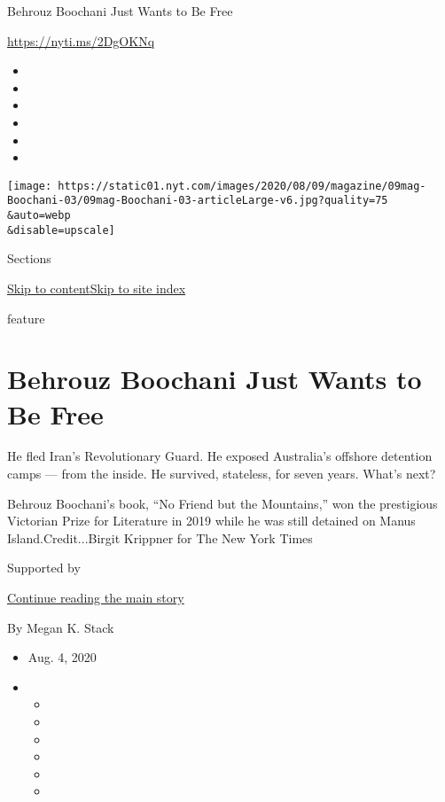 Behrouz Boochani Just Wants to Be Free

\url{https://nyti.ms/2DgOKNq}

\begin{itemize}
\item
\item
\item
\item
\item
\item
\end{itemize}

\texttt{[image: https://static01.nyt.com/images/2020/08/09/magazine/09mag-Boochani-03/09mag-Boochani-03-articleLarge-v6.jpg?quality=75\\\&auto=webp\\\&disable=upscale]}

Sections

\protect\hyperlink{site-content}{Skip to
content}\protect\hyperlink{site-index}{Skip to site index}

feature

\hypertarget{behrouz-boochani-just-wants-to-be-free}{%
\section{Behrouz Boochani Just Wants to Be
Free}\label{behrouz-boochani-just-wants-to-be-free}}

He fled Iran's Revolutionary Guard. He exposed Australia's offshore
detention camps --- from the inside. He survived, stateless, for seven
years. What's next?

Behrouz Boochani's book, ``No Friend but the Mountains,'' won the
prestigious Victorian Prize for Literature in 2019 while he was still
detained on Manus Island.Credit...Birgit Krippner for The New York Times

Supported by

\protect\hyperlink{after-sponsor}{Continue reading the main story}

By Megan K. Stack

\begin{itemize}
\item
  Aug. 4, 2020
\item
  \begin{itemize}
  \item
  \item
  \item
  \item
  \item
  \item
  \end{itemize}
\end{itemize}

